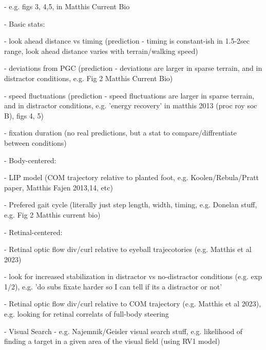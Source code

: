         - e.g. figs 3, 4,5, in Matthis Current Bio

  - Basic stats:
  
    - look ahead distance vs timing (prediction - timing is constant-ish in 1.5-2sec range, look ahead distance varies with terrain/walking speed)
    
    - deviations from PGC (prediction - deviations are larger in sparse terrain, and in distractor conditions, e.g. Fig 2 Matthis Current Bio)
    
    - speed fluctuations (prediction - speed fluctuations are larger in sparse terrain, and in distractor conditions, e.g. 'energy recovery' in matthis 2013 (proc roy soc B), figs 4, 5)
    
    - fixation duration (no real predictions, but a stat to compare/diffrentiate between conditions)
  
  - Body-centered:
  
      - LIP model (COM trajectory relative to planted foot, e.g. Koolen/Rebula/Pratt paper, Matthis Fajen 2013,14, etc)
      
      - Prefered gait cycle (literally just step length, width, timing, e.g. Donelan stuff, e.g. Fig 2 Matthis current bio)

  
  - Retinal-centered:
  
      - Retinal optic flow div/curl relative to eyeball trajecotories (e.g. Matthis et al 2023)
      
        - look for increased stabilization in distractor vs no-distractor conditions (e.g. exp 1/2), e.g. 'do subs fixate harder so I can tell if its a distractor or not'
        
        - Retinal optic flow div/curl relative to COM trajectory (e.g. Matthis et al 2023), e.g. looking for retinal correlats of full-body steering
      
      - Visual Search - e.g. Najemnik/Geisler visual search stuff, e.g. likelihood of finding a target in a given area of the visual field (using RV1 model)





